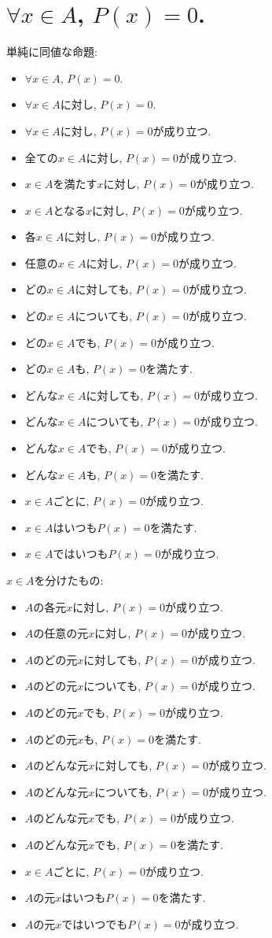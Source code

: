 \documentclass[a4paper,12pt,draft]{amsart}
\begin{document}
\section{$\forall x \in A$, $P(x)=0$.}
単純に同値な命題:
\begin{itemize}
\item $\forall x \in A$, $P(x)=0$.
\item $\forall x \in A$に対し, $P(x)=0$.
\item $\forall x \in A$に対し, $P(x)=0$が成り立つ.
\item 全ての$x\in A$に対し, $P(x)=0$が成り立つ.
\item $x\in A$を満たす$x$に対し, $P(x)=0$が成り立つ.
\item $x\in A$となる$x$に対し, $P(x)=0$が成り立つ.
\item 各$x\in A$に対し, $P(x)=0$が成り立つ.
\item 任意の$x\in A$に対し, $P(x)=0$が成り立つ.
\item どの$x\in A$に対しても, $P(x)=0$が成り立つ.
\item どの$x\in A$についても, $P(x)=0$が成り立つ.
\item どの$x\in A$でも, $P(x)=0$が成り立つ.
\item どの$x\in A$も, $P(x)=0$を満たす.
\item どんな$x\in A$に対しても, $P(x)=0$が成り立つ.
\item どんな$x\in A$についても, $P(x)=0$が成り立つ.
\item どんな$x\in A$でも, $P(x)=0$が成り立つ.
\item どんな$x\in A$も, $P(x)=0$を満たす.
\item $x\in A$ごとに, $P(x)=0$が成り立つ.
\item $x\in A$はいつも$P(x)=0$を満たす.
\item $x\in A$ではいつも$P(x)=0$が成り立つ.
\end{itemize}
$x\in A$を分けたもの:
\begin{itemize}
\item $A$の各元$x$に対し, $P(x)=0$が成り立つ.
\item $A$の任意の元$x$に対し, $P(x)=0$が成り立つ.
\item $A$のどの元$x$に対しても, $P(x)=0$が成り立つ.
\item $A$のどの元$x$についても, $P(x)=0$が成り立つ.
\item $A$のどの元$x$でも, $P(x)=0$が成り立つ.
\item $A$のどの元$x$も, $P(x)=0$を満たす.
\item $A$のどんな元$x$に対しても, $P(x)=0$が成り立つ.
\item $A$のどんな元$x$についても, $P(x)=0$が成り立つ.
\item $A$のどんな元$x$でも, $P(x)=0$が成り立つ.
\item $A$のどんな元$x$でも, $P(x)=0$を満たす.
\item $x\in A$ごとに, $P(x)=0$が成り立つ.
\item $A$の元$x$はいつも$P(x)=0$を満たす.
\item $A$の元$x$ではいつでも$P(x)=0$が成り立つ.
\end{itemize}
\end{document}
